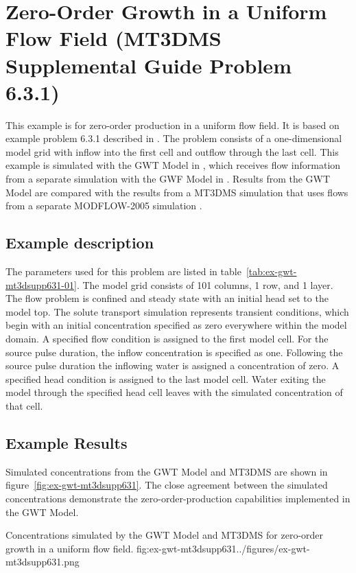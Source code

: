 \section{Zero-Order Growth in a Uniform Flow Field (MT3DMS Supplemental Guide Problem 6.3.1)}

This example is for zero-order production in a uniform flow field.  It is based on example problem 6.3.1 described in \cite{zheng2010mt3dmsv5.3}.  The problem consists of a one-dimensional model grid with inflow into the first cell and outflow through the last cell.  This example is simulated with the GWT Model in \mf, which receives flow information from a separate simulation with the GWF Model in \mf.  Results from the GWT Model are compared with the results from a MT3DMS simulation \citep{zheng1990mt3d} that uses flows from a separate MODFLOW-2005 simulation \citep{modflow2005}.  

\subsection{Example description}

The parameters used for this problem are listed in table~\ref{tab:ex-gwt-mt3dsupp631-01}.  The model grid consists of 101 columns, 1 row, and 1 layer.  The flow problem is confined and steady state with an initial head set to the model top.  The solute transport simulation represents transient conditions, which begin with an initial concentration specified as zero everywhere within the model domain.  A specified flow condition is assigned to the first model cell.  For the source pulse duration, the inflow concentration is specified as one.  Following the source pulse duration the inflowing water is assigned a concentration of zero.  A specified head condition is assigned to the last model cell.  Water exiting the model through the specified head cell leaves with the simulated concentration of that cell.



\subsection{Example Results}

Simulated concentrations from the \mf GWT Model and MT3DMS are shown in figure~\ref{fig:ex-gwt-mt3dsupp631}.  The close agreement between the simulated concentrations demonstrate the zero-order-production capabilities implemented in the GWT Model.

\begin{StandardFigure}{
                                     Concentrations simulated by the \mf GWT Model and MT3DMS for zero-order growth in a uniform flow field.
                                     }{fig:ex-gwt-mt3dsupp631}{../figures/ex-gwt-mt3dsupp631.png}
\end{StandardFigure}                                 

